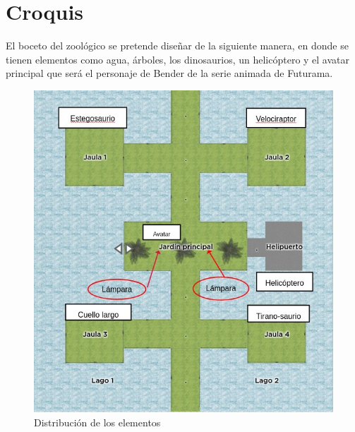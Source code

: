 \documentclass[12pt]{article} %
\begin{document}
		\section{Croquis}
		\setlength{\parindent}{1.0cm}
		El boceto del zoológico se pretende diseñar de la siguiente manera, en donde se tienen elementos como agua, árboles, los dinosaurios, un helicóptero y el avatar principal que será el personaje de Bender de la serie animada de Futurama. 
		\setlength{\parindent}{0.0cm}
		\begin{figure}[h]
			\begin{center}
				\includegraphics[scale=0.9]{images/Plano.png}
				\caption{Distribución de los elementos}
			\end{center}		
		\end{figure}
	
\end{document}
